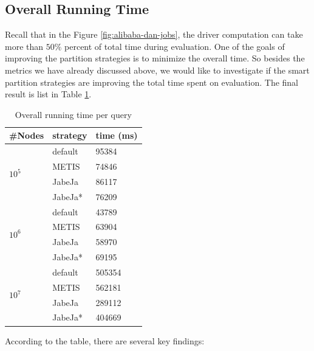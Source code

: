 \subsection{Overall Running Time}
Recall that in the Figure \ref{fig:alibaba-dan-jobs}, the driver computation can take more than $50\%$ percent of total time during evaluation. One of the goals of improving the partition strategies is to minimize the overall time. So besides the metrics we have already discussed above, we would like to investigate if the smart partition strategies are improving the total time spent on evaluation. The final result is list in Table \ref{overall-time}.
\begin{table}[h!]
\centering
\caption{Overall running time per query}
\label{overall-time}
\begin{tabular}{l|ll}
\hline
\#Nodes & strategy & time (ms)\\
\hline
\multirow{4}{*}{$10^5$}               & default & 95384  \\
                                      & METIS   & 74846  \\
                                      & JabeJa  & 86117  \\
                                      & JabeJa* & 76209  \\
\hline
\multirow{4}{*}{$10^6$}               & default & 43789  \\
                                      & METIS   & 63904  \\
                                      & JabeJa  & 58970  \\
                                      & JabeJa* & 69195  \\
\hline
\multirow{4}{*}{$10^7$}               & default & 505354 \\
                                      & METIS   & 562181 \\
                                      & JabeJa  & 289112 \\
                                      & JabeJa* & 404669 \\
\hline
\end{tabular}
\end{table}
According to the table, there are several key findings:
